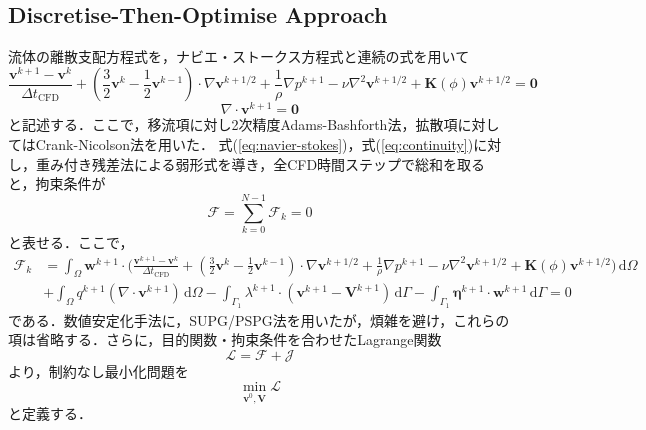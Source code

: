 \documentclass[a4paper,xelatex,ja=standard]{bxjsarticle}
\begin{document}
\subsection{Discretise-Then-Optimise Approach}
流体の離散支配方程式を，ナビエ・ストークス方程式と連続の式を用いて
\begin{equation}
    \label{eq:navier-stokes}
    \frac{\mathbf{v}^{k+1}-\mathbf{v}^k}{\Delta t_{\text{CFD}}} + \left( \frac{3}{2}\mathbf{v}^k - \frac{1}{2}\mathbf{v}^{k-1} \right) \cdot \nabla \mathbf{v}^{k+1 / 2} + \frac{1}{\rho} \nabla p^{k+1} - \nu \nabla^2 \mathbf{v}^{k+1/2} + \mathbf{K}(\phi) \mathbf{v}^{k+1/2} = \mathbf{0}
\end{equation}
\begin{equation}
    \label{eq:continuity}
    \nabla \cdot \mathbf{v}^{k+1}=\mathbf{0}
\end{equation}
と記述する．ここで，移流項に対し2次精度Adams-Bashforth法，拡散項に対してはCrank-Nicolson法を用いた．
式(\ref{eq:navier-stokes})，式(\ref{eq:continuity})に対し，重み付き残差法による弱形式を導き，全CFD時間ステップで総和を取ると，拘束条件が
\begin{equation}
    \label{eq:weak-form}
    \mathcal{F}=\sum_{k=0}^{N-1} \mathcal{F}_{k} = 0
\end{equation}
と表せる．ここで，
\begin{equation}
    \label{eq:weak-form-k}
    \begin{aligned}
        \mathcal{F}_{k} & = \int_{\Omega} \mathbf{w}^{k+1} \cdot \bigg( \frac{\mathbf{v}^{k+1}-\mathbf{v}^k}{\Delta t_{\text{CFD}}} +\left( \frac{3}{2}\mathbf{v}^k - \frac{1}{2}\mathbf{v}^{k-1} \right) \cdot \nabla \mathbf{v}^{k+1 / 2} + \frac{1}{\rho} \nabla p^{k+1} - \nu \nabla^2 \mathbf{v}^{k+1/2} + \mathbf{K}(\phi) \mathbf{v}^{k+1/2} \bigg) \, \mathrm{d}\Omega \\
        &+ \int_{\Omega} q^{k+1}(\nabla \cdot \mathbf{v}^{k+1}) \, \mathrm{d}\Omega - \int_{\Gamma_1} \lambda^{k+1} \cdot (\mathbf{v}^{k+1} - \mathbf{V}^{k+1}) \, \mathrm{d}\Gamma - \int_{\Gamma_1} \boldsymbol{\eta}^{k+1} \cdot \mathbf{w}^{k+1} \, \mathrm{d}\Gamma = 0
    \end{aligned}
\end{equation}
である．数値安定化手法に，SUPG/PSPG法を用いたが，煩雑を避け，これらの項は省略する．さらに，目的関数・拘束条件を合わせたLagrange関数
\begin{equation}
    \label{eq:lagrange}
    \mathcal{L} = \mathcal{F} + \mathcal{J}
\end{equation}
より，制約なし最小化問題を
\begin{equation}
    \label{eq:minimization}
    \min_{\mathbf{v}^{0}, \mathbf{V}} \mathcal{L}
\end{equation}
と定義する．
\end{document}
